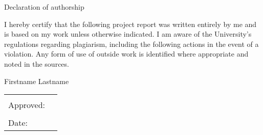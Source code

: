 \begin{center}
\large
Declaration of authorship
\end{center}

\noindent I hereby certify that the following project report was written entirely by me and is based on my work unless otherwise indicated. I am aware of the University's regulations regarding plagiarism, including the following actions in the event of a violation. Any form of use of outside work is identified where appropriate and noted in the sources.

\vspace{1cm}

\begin{center}
\large
Firstname Lastname
\end{center}

\begin{tabular}{p{5cm}p{10cm}}
& \\
Approved: & \hrulefill \\
& \\
Date: & \hrulefill \\
\end{tabular}